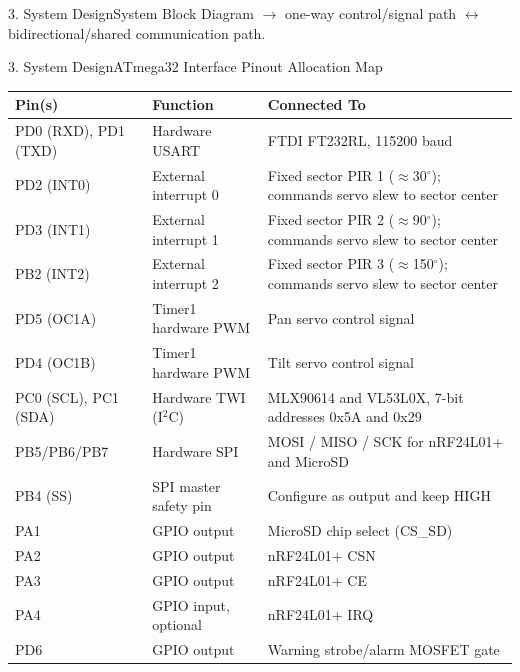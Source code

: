 \documentclass[aspectratio=169, 10pt]{beamer}
\begin{document}
\begin{frame}{3. System Design}{System Block Diagram}
    {\tiny\color{TextDim} $\rightarrow$ one-way control/signal path \quad $\leftrightarrow$ bidirectional/shared communication path.}
\end{frame}

\begin{frame}{3. System Design}{ATmega32 Interface Pinout Allocation Map}
    \scriptsize
    \renewcommand{\arraystretch}{0.92}
    \begin{table}
        \centering
        \begin{tabular}{lll}
            \toprule
            \textbf{\color{Accent} Pin(s)} & \textbf{\color{Accent} Function} & \textbf{\color{Accent} Connected To} \\
            \midrule
            PD0 (RXD), PD1 (TXD) & Hardware USART & FTDI FT232RL, 115200 baud \\
            PD2 (INT0) & External interrupt 0 & Fixed sector PIR 1 ($\approx$30$^\circ$); commands servo slew to sector center \\
            PD3 (INT1) & External interrupt 1 & Fixed sector PIR 2 ($\approx$90$^\circ$); commands servo slew to sector center \\
            PB2 (INT2) & External interrupt 2 & Fixed sector PIR 3 ($\approx$150$^\circ$); commands servo slew to sector center \\
            PD5 (OC1A) & Timer1 hardware PWM & Pan servo control signal \\
            PD4 (OC1B) & Timer1 hardware PWM & Tilt servo control signal \\
            PC0 (SCL), PC1 (SDA) & Hardware TWI (I$^2$C) & MLX90614 and VL53L0X, 7-bit addresses 0x5A and 0x29 \\
            PB5/PB6/PB7 & Hardware SPI & MOSI / MISO / SCK for nRF24L01+ and MicroSD \\
            PB4 (SS) & SPI master safety pin & Configure as output and keep HIGH \\
            PA1 & GPIO output & MicroSD chip select (CS\_SD) \\
            PA2 & GPIO output & nRF24L01+ CSN \\
            PA3 & GPIO output & nRF24L01+ CE \\
            PA4 & GPIO input, optional & nRF24L01+ IRQ \\
            PD6 & GPIO output & Warning strobe/alarm MOSFET gate \\
            \bottomrule
        \end{tabular}
    \end{table}
\end{frame}
\end{document}
